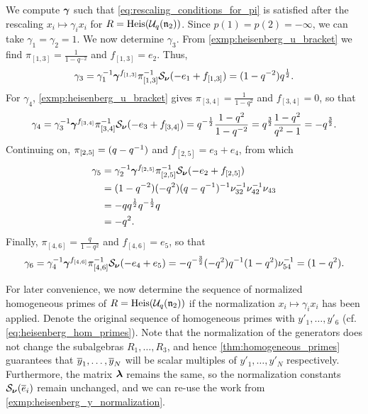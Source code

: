 \begin{example}\label{exmp:heisenberg_rescaling}

	We compute $\boldsymbol{\gamma}$ such that \cref{eq:rescaling_conditions_for_pi} is satisfied after
	the rescaling $x_i \mapsto \gamma_i x_i$ for $R = \operatorname{Heis}(\mathcal{U}_q(\mathfrak{n}_2))$. Since $p(1) = p(2) =
		-\infty$, we can take $\gamma_1 = \gamma_2 = 1$. We now determine $\gamma_3$. From
	\cref{exmp:heisenberg_u_bracket} we find $\pi_{[1, 3]} = \frac{1}{1-q^{-2}}$ and
	$f_{[1, 3]} = e_2$. Thus,
	\begin{equation*}
		\gamma_3 = \gamma_1^{-1} \boldsymbol{\gamma}^{f_{[1,3]}}\pi_{[1,3]}^{-1} \mathcal{S}_{\boldsymbol{\nu}}(-e_1 + f_{[1,3]}) = (1-q^{-2})q^{\frac{1}{2}}.
	\end{equation*}
	For $\gamma_4$, \cref{exmp:heisenberg_u_bracket} gives $\pi_{[3,4]} = \frac{1}{1-q^2}$
	and $f_{[3,4]} = 0$, so that
	\begin{equation*}
		\gamma_4 = \gamma_3^{-1} \boldsymbol{\gamma}^{f_{[3,4]}}\pi_{[3,4]}^{-1} \mathcal{S}_{\boldsymbol{\nu}}(-e_3 + f_{[3,4]}) = q^{-\frac{1}{2}}\frac{1-q^2}{1-q^{-2}} = q^{\frac{3}{2}} \frac{1-q^2}{q^2 - 1} = -q^{\frac{3}{2}}.
	\end{equation*}
	Continuing on, $\pi_{[2,5]} = (q - q^{-1})$ and $f_{[2,5]} = e_3 + e_4$, from which
	\begin{align*}
		\gamma_5
		 & = \gamma_2^{-1} \boldsymbol{\gamma}^{f_{[2,5]}}\pi_{[2,5]}^{-1} \mathcal{S}_{\boldsymbol{\nu}}(-e_2 + f_{[2,5]}) \\
		 & = (1-q^{-2})(-q^2)(q-q^{-1})^{-1} \nu_{32}^{-1}\nu_{42}^{-1}\nu_{43}             \\
		 & = -q q^{\frac{1}{2}} q^{-\frac{1}{2}}q                                       \\
		 & = -q^2.
	\end{align*}
	Finally, $\pi_{[4,6]} = \frac{q}{1-q^2}$ and $f_{[4,6]} = e_5$, so that
	\begin{equation*}
		\gamma_6
		= \gamma_4^{-1} \boldsymbol{\gamma}^{f_{[4,6]}}\pi_{[4,6]}^{-1} \mathcal{S}_{\boldsymbol{\nu}}(-e_4 + e_5)
		= -q^{-\frac{3}{2}} (-q^2) q^{-1}(1-q^2)\nu_{54}^{-1}
		= (1-q^2).
	\end{equation*}

	For later convenience, we now determine the sequence of normalized homogeneous primes
	of $R = \operatorname{Heis}(\mathcal{U}_q(\mathfrak{n}_2))$ if the normalization $x_i \mapsto \gamma_i x_i$ has been applied.
	Denote the original sequence of homogeneous primes with $y'_1, \dots, y'_6$ (cf.
	\cref{eq:heisenberg_hom_primes}). Note that the normalization of the generators does
	not change the subalgebras $R_1, \dots, R_3$, and hence \cref{thm:homogeneous_primes}
	guarantees that $\overline{y}_1, \dots, \overline{y}_N$ will be scalar multiples of $y'_1, \dots, y'_N$
	respectively. Furthermore, the matrix $\boldsymbol{\lambda}$ remains the same, so the normalization
	constants $\mathcal{S}_{\boldsymbol{\nu}}(\overline{e}_i)$ remain unchanged, and we can re-use the work from
	\cref{exmp:heisenberg_y_normalization}.


\end{example}
